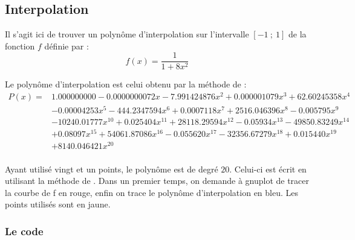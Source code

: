 \subsection{Interpolation} 

Il s'agit ici de trouver un polynôme d'interpolation sur l'intervalle $[-1~;~1]$ de la fonction $f$ définie par :
\[
  f(x)=\frac{1}{1+8x^2}
\]
 
Le polynôme d'interpolation est celui obtenu par la méthode de  :
\begin{equation*}
\begin{split}
 P(x) = &1.000000000-0.0000000072x-7.991424876x^2+0.000001079x^3+62.60245358x^4\\
 & -0.00004253x^5-444.2347594x^6+0.0007118x^7+ 2516.046396x^8 -0.005795x^9\\ &-10240.01777x^{10} +0.025404x^{11}+28118.29594x^{12} -0.05934x^{13} -49850.83249x^{14} \\
& +0.08097x^{15}+54061.87086x^{16} -0.055620x^{17} -32356.67279x^{18} +0.015440x^{19}\\
&+8140.046421x^{20}\\
\end{split}
\end{equation*}

Ayant utilisé vingt et un points, le polynôme est de degré $20$. Celui-ci est écrit en utilisant la méthode de . Dans un premier temps, on demande à gnuplot de tracer la courbe de f en rouge,  enfin on trace le polynôme d'interpolation en bleu. Les points utilisés sont en jaune. 

\subsubsection{Le code}
\begin{tkzexample}
\end{tkzexample}

